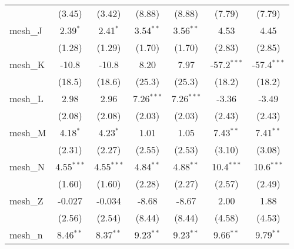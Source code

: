 \begin{tabular}{lcccccc}
                                                               & (3.45)        & (3.42)        & (8.88)        & (8.88)         & (7.79)        & (7.79)\\   
   mesh\_J                                                     & 2.39$^{*}$    & 2.41$^{*}$    & 3.54$^{**}$   & 3.56$^{**}$    & 4.53          & 4.45\\   
                                                               & (1.28)        & (1.29)        & (1.70)        & (1.70)         & (2.83)        & (2.85)\\   
   mesh\_K                                                     & -10.8         & -10.8         & 8.20          & 7.97           & -57.2$^{***}$ & -57.4$^{***}$\\   
                                                               & (18.5)        & (18.6)        & (25.3)        & (25.3)         & (18.2)        & (18.2)\\   
   mesh\_L                                                     & 2.98          & 2.96          & 7.26$^{***}$  & 7.26$^{***}$   & -3.36         & -3.49\\   
                                                               & (2.08)        & (2.08)        & (2.03)        & (2.03)         & (2.43)        & (2.43)\\   
   mesh\_M                                                     & 4.18$^{*}$    & 4.23$^{*}$    & 1.01          & 1.05           & 7.43$^{**}$   & 7.41$^{**}$\\   
                                                               & (2.31)        & (2.27)        & (2.55)        & (2.53)         & (3.10)        & (3.08)\\   
   mesh\_N                                                     & 4.55$^{***}$  & 4.55$^{***}$  & 4.84$^{**}$   & 4.88$^{**}$    & 10.4$^{***}$  & 10.6$^{***}$\\   
                                                               & (1.60)        & (1.60)        & (2.28)        & (2.27)         & (2.57)        & (2.49)\\   
   mesh\_Z                                                     & -0.027        & -0.034        & -8.68         & -8.67          & 2.00          & 1.88\\   
                                                               & (2.56)        & (2.54)        & (8.44)        & (8.44)         & (4.58)        & (4.53)\\   
   mesh\_n                                                     & 8.46$^{**}$   & 8.37$^{**}$   & 9.23$^{**}$   & 9.23$^{**}$    & 9.66$^{**}$   & 9.79$^{**}$\\   

\end{tabular}
